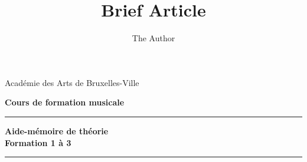 \documentclass[11pt]{scrreprt}
\title{Brief Article}
\author{The Author}
\begin{document}
\thispagestyle{empty}
\begin{center}
\begin{LARGE}
Académie des Arts de Bruxelles-Ville
\end{LARGE}
\end{center}

\begin{center}
\begin{LARGE}
\textbf{Cours de formation musicale}
\end{LARGE}
\end{center}

\begin{center}
\vspace{5cm}
\noindent\rule{\textwidth}{0.5mm}
\begin{huge}
\textbf{Aide-mémoire de théorie \\
\vspace{2 cm}
 Formation 1 à 3}
\end{huge}
\noindent\rule{\textwidth}{0.5mm}
\end{center}

%
%
%
%
\newpage
{}
\fancyfoot[CO]{\thepage}%
\renewcommand{\contentsname}{Sommaire}
\tableofcontents
\cleardoublepage







\printindex
\end{document}
